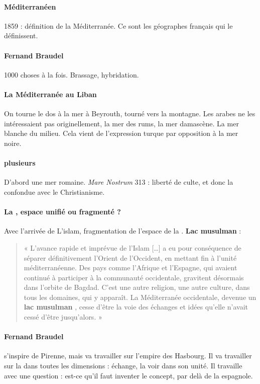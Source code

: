 \paragraph{Méditerranéen} 1859 : définition de la Méditerranée. Ce sont les géographes français qui le définissent. 
\paragraph{Fernand Braudel} 1000 choses à la fois. Brassage, hybridation. 

\paragraph{La Méditerranée au Liban} On tourne le dos à la mer à Beyrouth, tourné vers la montagne. Les arabes ne les intéressaient pas originellement, la mer des rums, la mer damascène. La mer blanche du milieu. Cela vient de l'expression turque par opposition à la mer noire.

\paragraph{plusieurs \Med}

D'abord une mer romaine. \textit{Mare Nostrum}
313 : liberté de culte, et donc la \Med confondue avec le Christianisme. 

\paragraph{La \Med, espace unifié ou fragmenté ?} Avec l'arrivée de L'islam, fragmentation de l'espace de la \Med. \textbf{Lac musulman} : 

\begin{quote}
    «
L’avance rapide  et imprévue de l’Islam […] a eu pour conséquence de
séparer définitivement l’Orient de l’Occident, en mettant fin à l’unité
méditerranéenne. Des pays comme l’Afrique et l’Espagne, qui avaient
continué à participer à la communauté occidentale, gravitent
désormais dans l’orbite de Bagdad. C’est une autre religion, une autre
culture, dans tous les domaines, qui y apparaît. La Méditerranée
occidentale, devenue un \textbf{lac musulman} , cesse d’être la voie des
échanges et idées qu’elle n’avait cessé d’être jusqu’alors. »
\end{quote}

\paragraph{Fernand Braudel} s'inspire de Pirenne, mais va travailler sur l'empire des Hasbourg. Il va travailler sur la \Med dans toutes les dimensions : échange, la voir dans son unité. Il travaille avec une question : est-ce qu'il faut inventer le concept, par delà de la \Med espagnole. 

